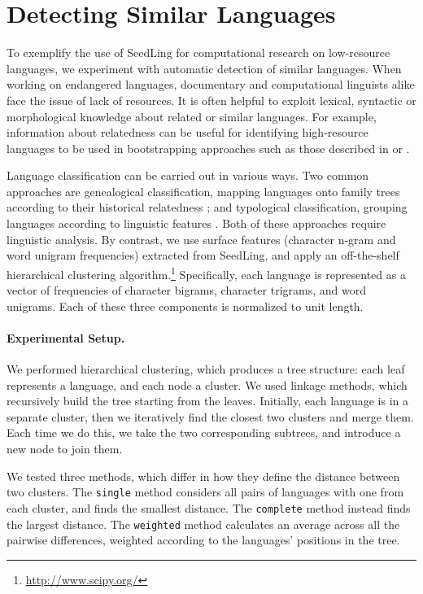 \section{Detecting Similar Languages} \label{sec:cluster}

To exemplify the use of SeedLing for computational research on low-resource languages, we experiment with automatic detection of similar languages. When working on endangered languages, documentary and computational linguists alike face the issue of lack of resources. It is often helpful to exploit lexical, syntactic or morphological knowledge about related or similar languages. For example, information about relatedness can be useful for identifying high-resource languages to be used in bootstrapping approaches such as those described in  or .

Language classification can be carried out in various ways. Two common approaches are genealogical classification, mapping languages onto family trees according to their historical relatedness \cite{swadesh1952,starostin2010}; and typological classification, grouping languages according to linguistic features \cite{georgi2010wals,daume2009}. Both of these approaches require linguistic analysis. By contrast, we use surface features (character n-gram and word unigram frequencies) extracted from SeedLing, and apply an off-the-shelf hierarchical clustering algorithm.\footnote{\url{http://www.scipy.org/}} Specifically, each language is represented as a vector of frequencies of character bigrams, character trigrams, and word unigrams. Each of these three components is normalized to unit length.

\paragraph{Experimental Setup.}
We performed hierarchical clustering, which produces a tree structure: each leaf represents a language, and each node a cluster. We used linkage methods, which recursively build the tree starting from the leaves. Initially, each language is in a separate cluster, then we iteratively find the closest two clusters and merge them. Each time we do this, we take the two corresponding subtrees, and introduce a new node to join them.

We tested three methods, which differ in how they define the distance between two clusters. The \texttt{single} method considers all pairs of languages with one from each cluster, and finds the smallest distance. The \texttt{complete} method instead finds the largest distance. The \texttt{weighted} method calculates an average across all the pairwise differences, weighted according to the languages' positions in the tree.

